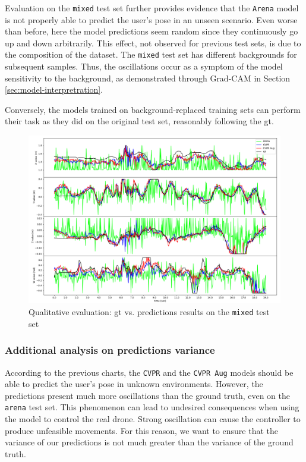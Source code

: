 Evaluation on the \texttt{mixed} test set further provides evidence that the \texttt{Arena} model is not properly able to predict the user's pose in an unseen scenario. Even worse than before, here the model predictions seem random since they continuously go up and down arbitrarily. This effect, not observed for previous test sets, is due to the composition of the dataset. The \texttt{mixed} test set has different backgrounds for subsequent samples. Thus, the oscillations occur as a symptom of the model sensitivity to the background, as demonstrated through Grad-CAM in Section \ref{sec:model-interpretration}.

Conversely, the models trained on background-replaced training sets can perform their task as they did on the original test set, reasonably following the \gls{gt}.

\begin{figure}[H]
	\centering
	\includegraphics[width=1 \textwidth]{"contents/images/06-gtpred-mixed"}
	\caption[Qualitative evaluation: \gls{gt} vs. predictions results on the \texttt{mixed} test set]{Qualitative evaluation: \gls{gt} vs. predictions results on the \texttt{mixed} test set}
	\label{fig:ql-gtpred-mixed}
\end{figure}


\subsubsection*{Additional analysis on predictions variance}

According to the previous charts, the \texttt{CVPR} and the \texttt{CVPR Aug} models should be able to predict the user's pose in unknown environments. However, the predictions present much more oscillations than the ground truth, even on the \texttt{arena} test set. This phenomenon can lead to undesired consequences when using the model to control the real drone. Strong oscillation can cause the controller to produce unfeasible movements. For this reason, we want to ensure that the variance of our predictions is not much greater than the variance of the ground truth.

